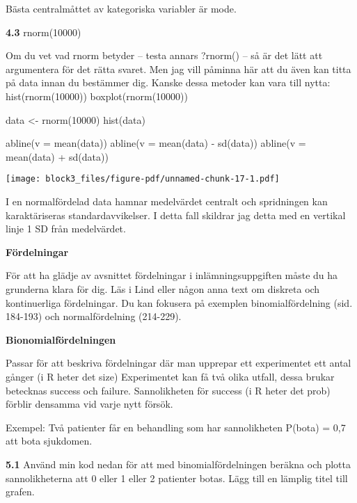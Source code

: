 \documentclass[
  letterpaper,
  DIV=11,
  numbers=noendperiod]{scrartcl}
\newenvironment{Shaded}{\begin{snugshade}}{\end{snugshade}}
\newcommand{\AttributeTok}[1]{\textcolor[rgb]{0.40,0.45,0.13}{#1}}
\newcommand{\DecValTok}[1]{\textcolor[rgb]{0.68,0.00,0.00}{#1}}
\newcommand{\FunctionTok}[1]{\textcolor[rgb]{0.28,0.35,0.67}{#1}}
\newcommand{\NormalTok}[1]{\textcolor[rgb]{0.00,0.23,0.31}{#1}}
\newcommand{\OtherTok}[1]{\textcolor[rgb]{0.00,0.23,0.31}{#1}}
\newcommand{\SpecialCharTok}[1]{\textcolor[rgb]{0.37,0.37,0.37}{#1}}
\begin{document}
Bästa centralmåttet av kategoriska variabler är mode.

\textbf{4.3} rnorm(10000)

Om du vet vad rnorm betyder -- testa annars ?rnorm() -- så är det lätt
att argumentera för det rätta svaret. Men jag vill påminna här att du
även kan titta på data innan du bestämmer dig. Kanske dessa metoder kan
vara till nytta: hist(rnorm(10000)) boxplot(rnorm(10000))

\begin{Shaded}
\begin{Highlighting}[]
\NormalTok{data }\OtherTok{\textless{}{-}} \FunctionTok{rnorm}\NormalTok{(}\DecValTok{10000}\NormalTok{)}
\FunctionTok{hist}\NormalTok{(data)}

\FunctionTok{abline}\NormalTok{(}\AttributeTok{v =} \FunctionTok{mean}\NormalTok{(data))}
\FunctionTok{abline}\NormalTok{(}\AttributeTok{v =} \FunctionTok{mean}\NormalTok{(data) }\SpecialCharTok{{-}} \FunctionTok{sd}\NormalTok{(data))}
\FunctionTok{abline}\NormalTok{(}\AttributeTok{v =} \FunctionTok{mean}\NormalTok{(data) }\SpecialCharTok{+} \FunctionTok{sd}\NormalTok{(data))}
\end{Highlighting}
\end{Shaded}

\texttt{[image: block3\_files/figure-pdf/unnamed-chunk-17-1.pdf]}

I en normalfördelad data hamnar medelvärdet centralt och spridningen kan
karaktäriseras standardavvikelser. I detta fall skildrar jag detta med
en vertikal linje 1 SD från medelvärdet.

\textbf{Fördelningar}

För att ha glädje av avsnittet fördelningar i inlämningsuppgiften måste
du ha grunderna klara för dig. Läs i Lind eller någon anna text om
diskreta och kontinuerliga fördelningar. Du kan fokusera på exemplen
binomialfördelning (sid. 184-193) och normalfördelning (214-229).

\textbf{Bionomialfördelningen}

Passar för att beskriva fördelningar där man upprepar ett experimentet
ett antal gånger (i R heter det size) Experimentet kan få två olika
utfall, dessa brukar betecknas success och failure. Sannolikheten för
success (i R heter det prob) förblir densamma vid varje nytt försök.

Exempel: Två patienter får en behandling som har sannolikheten P(bota) =
0,7 att bota sjukdomen.

\textbf{5.1} Använd min kod nedan för att med binomialfördelningen
beräkna och plotta sannolikheterna att 0 eller 1 eller 2 patienter
botas. Lägg till en lämplig titel till grafen.
\end{document}
